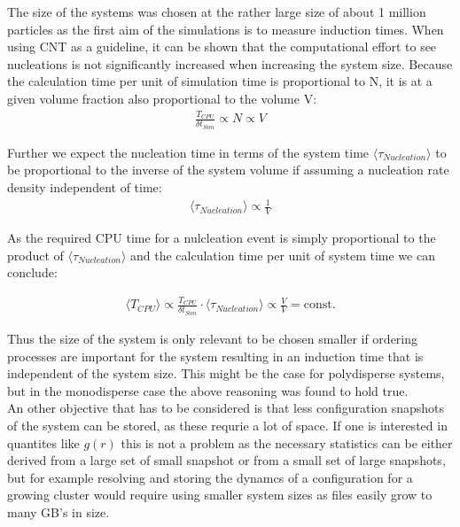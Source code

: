 The size of the systems was chosen at the rather large size of about 1 million particles as the first aim of the simulations is to measure induction times. When using CNT as a guideline, it can be shown that the computational effort to see nucleations is not significantly increased when increasing the system size. Because the calculation time per unit of simulation time is proportional to N, it is at a given volume fraction also proportional to the volume V:
\begin{align}
\label{eqn:system_size}
\frac{T_{CPU}}{\delta t_{Sim}} \propto N \propto V 
\end{align}


Further we expect the nucleation time in terms of the system time $\langle \tau_{Nucleation} \rangle$ to be proportional to the inverse of the system volume if assuming a nucleation rate density independent of time:
\begin{align}
\langle \tau_{Nucleation} \rangle \propto \frac{1}{V}
\end{align}

As the required CPU time for a nulcleation event is simply proportional to the product of $\langle \tau_{Nucleation} \rangle$ and the calculation time per unit of system time we can conclude:

\begin{align}
\langle T_{CPU} \rangle \propto  \frac{T_{CPU}}{\delta t_{Sim}}  \cdot \langle \tau_{Nucleation} \rangle \propto \frac{V}{V} = \text{const.}
\end{align}

Thus the size of the system is only relevant to be chosen smaller if ordering processes are important for the system resulting in an induction time that is independent of the system size. This might be the case for polydisperse systems, but in the monodisperse case the above reasoning was found to hold true.\\
An other objective that has to be considered is that less configuration snapshots of the system can be stored, as these requrie a lot of space. If one is interested in quantites like $g(r)$ this is not a problem as the necessary statistics can be either derived from a large set of small snapshot or from a small set of large snapshots, but for example resolving and storing the dynamcs of a configuration for a growing cluster would require using smaller system sizes as files easily grow to many GB's in size. 

